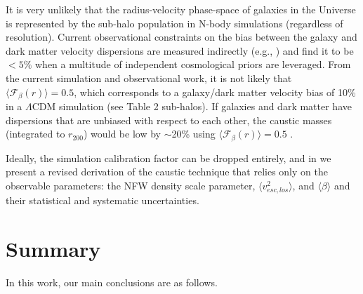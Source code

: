 \documentclass[iop]{emulateapj}
\begin{document}
It is very unlikely that the radius-velocity phase-space of galaxies in the Universe is represented by the sub-halo population in N-body simulations (regardless of resolution). Current observational constraints on the bias between the galaxy and dark matter velocity dispersions are measured indirectly (e.g., \citet{Rines08}) and find it to be $< 5\%$ when a multitude of independent cosmological priors are leveraged. From the current simulation and observational work, it is not likely that $\langle \mathcal{F}_{\beta}(r) \rangle = 0.5$, which corresponds to a galaxy/dark matter velocity bias of 10\% in a $\Lambda$CDM simulation (see Table 2 sub-halos). If galaxies and dark matter have dispersions that are unbiased with respect to each other, the caustic masses (integrated to $r_{200}$) would be low by $\sim$20\% using $\langle \mathcal{F}_{\beta}(r) \rangle = 0.5$ \citep{Geller13,Rines13}. 

Ideally, the simulation calibration factor can be dropped entirely, and in \citet{Gifford13b} we present a revised derivation of the caustic technique that relies only on the observable parameters: the NFW density scale parameter, $\langle v^2_{esc,los} \rangle$, and $\langle \beta \rangle$ and their statistical and systematic uncertainties.

\section{Summary}
In this work, our main conclusions are as follows.
\end{document}
